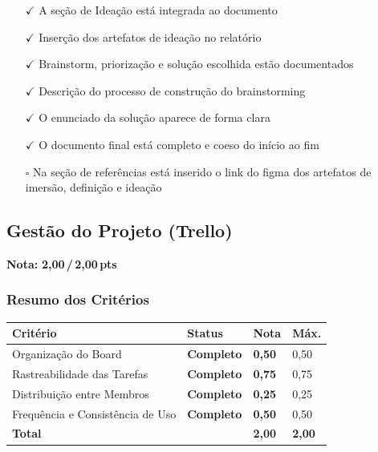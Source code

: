\documentclass[
  sigconf,
  nonacm, %
  language=portuguese
]{acmart}
\newcommand{\notadestaque}[2]{%
  \noindent\textbf{Nota:}\enspace%
  {\large\bfseries\color{cred}#1\,/\,#2\,pts}%
}
\newcommand{\statusok}[1]{{\small\bfseries\color{cgood}#1}}
\begin{document}
\noindent\statusok{1,00\,/\,1,00 pts · Completo}

\begin{itemize}[leftmargin=14pt,itemsep=1pt,topsep=3pt,parsep=0pt]
  \item[\textcolor{cgood}{$\checkmark$}] {\small\textcolor{cgood}{A seção de Ideação está integrada ao documento}}
  \item[\textcolor{cgood}{$\checkmark$}] {\small\textcolor{cgood}{Inserção dos artefatos de ideação no relatório}}
  \item[\textcolor{cgood}{$\checkmark$}] {\small\textcolor{cgood}{Brainstorm, priorização e solução escolhida estão documentados}}
  \item[\textcolor{cgood}{$\checkmark$}] {\small\textcolor{cgood}{Descrição do processo de construção do brainstorming}}
  \item[\textcolor{cgood}{$\checkmark$}] {\small\textcolor{cgood}{O enunciado da solução aparece de forma clara}}
  \item[\textcolor{cgood}{$\checkmark$}] {\small\textcolor{cgood}{O documento final está completo e coeso do início ao fim}}
  \item[$\square$] {\small\textcolor{cmuted}{Na seção de referências está inserido o link do figma dos artefatos de imersão, definição e ideação}}
\end{itemize}

\subsection{Gestão do Projeto (Trello)}

\notadestaque{2,00}{2,00}

\subsubsection*{Resumo dos Critérios}

\begin{tabular}{@{} L{2.6cm} C{2.5cm} C{1.1cm} C{1.1cm} @{}}
\toprule
\textbf{Critério} & \textbf{Status} & \textbf{Nota} & \textbf{Máx.} \\
\midrule
Organização do Board & \statusok{Completo} & \textbf{0,50} & 0,50 \\
Rastreabilidade das Tarefas & \statusok{Completo} & \textbf{0,75} & 0,75 \\
Distribuição entre Membros & \statusok{Completo} & \textbf{0,25} & 0,25 \\
Frequência e Consistência de Uso & \statusok{Completo} & \textbf{0,50} & 0,50 \\
\midrule
\textbf{Total} & & \textbf{\color{cred}2,00} & \textbf{2,00} \\
\bottomrule
\end{tabular}
\end{document}
